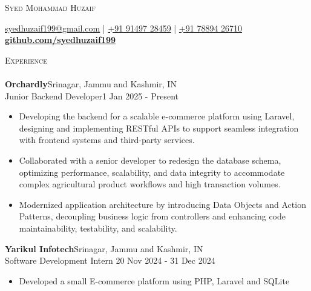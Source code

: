 \documentclass[a4paper]{article}
\newcommand{\lineunder} {
    \vspace*{-8pt} \\
    \hspace*{-18pt} \hrulefill \\
}
\newcommand{\header} [1] {
    {\hspace*{-18pt}\vspace*{6pt} \textsc{#1}}
    \vspace*{-6pt} \lineunder
}
\begin{document}
    \vspace*{-40pt}

    

%
%
  \vspace*{-2pt}
  \begin{center}
    {\Huge \scshape {Syed Mohammad Huzaif}}\\
    \vspace*{2pt}
    
    \vspace*{2pt}
    \href{mailto:syedhuzaif199@gmail.com}{syedhuzaif199@gmail.com} | \href{tel:+919149728459}{+91 91497 28459} | \href{tel:+917889426710}{+91 78894 26710}\\
    \vspace*{2pt}
    \textbf{\href{https://github.com/syedhuzaif199}{github.com/syedhuzaif199}}
  \end{center}

      \header{Experience}
    \vspace{2mm}
        \textbf{Orchardly}\hfill Srinagar, Jammu and Kashmir, IN\\
    Junior Backend Developer\hfill 1 Jan 2025 - Present\\
    \vspace{-2mm}
    \begin{itemize}
    \item[] Developing the backend for a scalable e-commerce platform using Laravel, designing and implementing RESTful APIs to support seamless integration with frontend systems and third-party services.

    \item[] Collaborated with a senior developer to redesign the database schema, optimizing performance, scalability, and data integrity to accommodate complex agricultural product workflows and high transaction volumes.

    \item[] Modernized application architecture by introducing Data Objects and Action Patterns, decoupling business logic from controllers and enhancing code maintainability, testability, and scalability.
    \end{itemize}
      \vspace{2mm}
      \textbf{Yarikul Infotech}\hfill Srinagar, Jammu and Kashmir, IN\\
    Software Development Intern \hfill 20 Nov 2024 - 31 Dec 2024\\
    \vspace{-2mm}
    \begin{itemize}
    \item[] Developed a small E-commerce platform using PHP, Laravel and SQLite
    \end{itemize}
\end{document}
